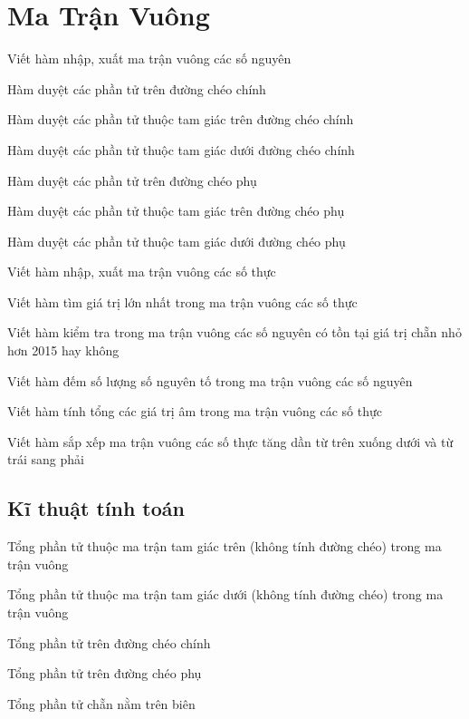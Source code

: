 \chapter{Ma Trận Vuông}
\hypertarget{localtoc\thechapter}{}
\localtoc

\begin{problem}
    Viết hàm nhập, xuất ma trận vuông các số nguyên

Hàm duyệt các phần tử trên đường chéo chính

Hàm duyệt các phần tử thuộc tam giác trên đường chéo chính

Hàm duyệt các phần tử thuộc tam giác dưới đường chéo chính

Hàm duyệt các phần tử trên đường chéo phụ

Hàm duyệt các phần tử thuộc tam giác trên đường chéo phụ

Hàm duyệt các phần tử thuộc tam giác dưới đường chéo phụ
\end{problem}
\begin{problem}
    Viết hàm nhập, xuất ma trận vuông các số thực
\end{problem}
\begin{problem}
    Viết hàm tìm giá trị lớn nhất trong ma trận vuông các số thực
\end{problem}
\begin{problem}
    Viết hàm kiểm tra trong ma trận vuông các số nguyên có tồn tại giá trị chẵn nhỏ hơn 2015 hay không
\end{problem}
\begin{problem}
    Viết hàm đếm số lượng số nguyên tố trong ma trận vuông các số nguyên
\end{problem}
\begin{problem}
    Viết hàm tính tổng các giá trị âm trong ma trận vuông các số thực
\end{problem}
\begin{problem}
    Viết hàm sắp xếp ma trận vuông các số thực tăng dần từ trên xuống dưới và từ trái sang phải
\end{problem}


\section{Kĩ thuật tính toán}
\begin{problem}
    Tổng phần tử thuộc ma trận tam giác trên (không tính đường chéo) trong ma trận vuông
\end{problem}
\begin{problem}
    Tổng phần tử thuộc ma trận tam giác dưới (không tính đường chéo) trong ma trận vuông
\end{problem}
\begin{problem}
    Tổng phần tử trên đường chéo chính
\end{problem}
\begin{problem}
    Tổng phần tử trên đường chéo phụ
\end{problem}
\begin{problem}
    Tổng phần tử chẵn nằm trên biên
\end{problem}

